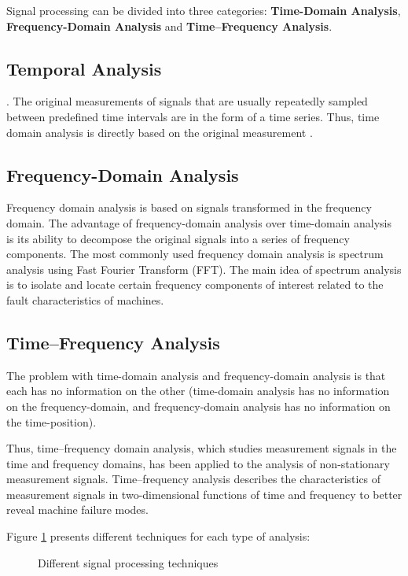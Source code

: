 Signal processing can be divided into three categories: \textbf{Time-Domain Analysis}, \textbf{Frequency-Domain Analysis} and \textbf{Time--Frequency Analysis}.

\subsection{Temporal Analysis}.
The original measurements of signals that are usually repeatedly sampled between predefined time intervals are in the form of a time series. Thus, time domain analysis is directly based on the original measurement \cite{Lei2016}.

\subsection{Frequency-Domain Analysis}
Frequency domain analysis is based on signals transformed in the frequency domain. The advantage of frequency-domain analysis over time-domain analysis is its ability to decompose the original signals into a series of frequency components. The most commonly used frequency domain analysis is spectrum analysis using Fast Fourier Transform (FFT). The main idea of spectrum analysis is to isolate and locate certain frequency components of interest related to the fault characteristics of \cite{Lei2016a} machines.

\subsection{Time--Frequency Analysis}
The problem with time-domain analysis and frequency-domain analysis is that each has no information on the other (time-domain analysis has no information on the frequency-domain, and frequency-domain analysis has no information on the time-position).

Thus, time--frequency domain analysis, which
studies measurement signals in the time and frequency domains, has been applied to the analysis of non-stationary measurement signals. Time--frequency analysis describes the characteristics of measurement signals in two-dimensional functions of time and frequency to better reveal machine failure modes.

Figure \ref{fig:signal-processing} presents different techniques for each type of analysis:

\begin{figure}[h]
    \centering
	
    \caption{Different signal processing techniques}
    \label{fig:signal-processing}
\end{figure}

